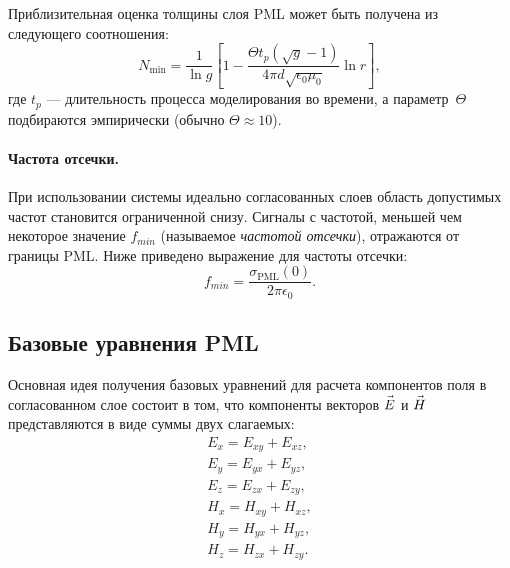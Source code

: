 \noindent
Приблизительная оценка толщины слоя PML может быть получена из следующего
соотношения:
\begin{equation}
\label{eq:hz1}
    N_\text{min}= \frac{1}{\ln g}
    \left[
        1 - \frac{\Theta t_p(\sqrt{g}-1)}{4\pi d \sqrt{\epsilon_0\mu_0}} \ln{r}
    \right],
\end{equation}
где $t_p$ --- длительность процесса моделирования во времени,
а параметр~$\Theta$ подбираются эмпирически (обычно $\Theta\approx10$).

\paragraph*{Частота отсечки.}
При использовании системы идеально согласованных слоев область допустимых частот
становится ограниченной снизу. Сигналы с частотой, меньшей чем некоторое
значение $f_{min}$ (называемое \emph{частотой отсечки}), отражаются от границы
PML. Ниже приведено выражение для частоты отсечки:
\begin{equation}
    \label{eq:PmlCutoffFrequency}
    f_{min} = \frac{\sigma_\text{PML}(0)}{2\pi\epsilon_0}.
\end{equation}


\subsection{Базовые уравнения PML}

Основная идея получения базовых уравнений для расчета компонентов поля
в согласованном слое состоит в том, что компоненты векторов $\vec{E\mathstrut}$
и $\vec{H\mathstrut}$ представляются в виде суммы двух слагаемых:
\begin{align}
\label{eq:PmlSplitFieldEquations}
    E_x = E_{xy}+E_{xz}, \\
    E_y = E_{yx}+E_{yz}, \\
    E_z = E_{zx}+E_{zy}, \\
    H_x = H_{xy}+H_{xz}, \\
    H_y = H_{yx}+H_{yz}, \\
    H_z = H_{zx}+H_{zy}.
\end{align}


